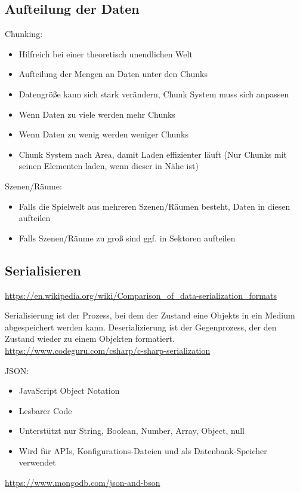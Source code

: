 \subsection{Aufteilung der Daten}
Chunking:
\begin{itemize}
    \item Hilfreich bei einer theoretisch unendlichen Welt
    \item Aufteilung der Mengen an Daten unter den Chunks
    \item Datengröße kann sich stark verändern, Chunk System muss sich anpassen
    \item Wenn Daten zu viele werden mehr Chunks
    \item Wenn Daten zu wenig werden weniger Chunks
    \item Chunk System nach Area, damit Laden effizienter läuft 
    (Nur Chunks mit seinen Elementen laden, wenn dieser in Nähe ist)
\end{itemize}

Szenen/Räume:
\begin{itemize}
    \item Falls die Spielwelt aus mehreren Szenen/Räumen besteht, Daten in diesen aufteilen
    \item Falls Szenen/Räume zu groß sind ggf. in Sektoren aufteilen
\end{itemize}


\subsection{Serialisieren}
\url{https://en.wikipedia.org/wiki/Comparison_of_data-serialization_formats}

Serialisierung ist der Prozess, bei dem der Zustand eine Objekts in ein Medium abgespeichert werden kann. Deserializierung ist der Gegenprozess, der den Zustand wieder zu einem Objekten formatiert.\\
\url{https://www.codeguru.com/csharp/c-sharp-serialization}

JSON:
\begin{itemize}
    \item JavaScript Object Notation
    \item Lesbarer Code
    \item Unterstützt nur String, Boolean, Number, Array, Object, null
    \item Wird für APIs, Konfigurations-Dateien und als Datenbank-Speicher verwendet 
\end{itemize}
\url{https://www.mongodb.com/json-and-bson}

